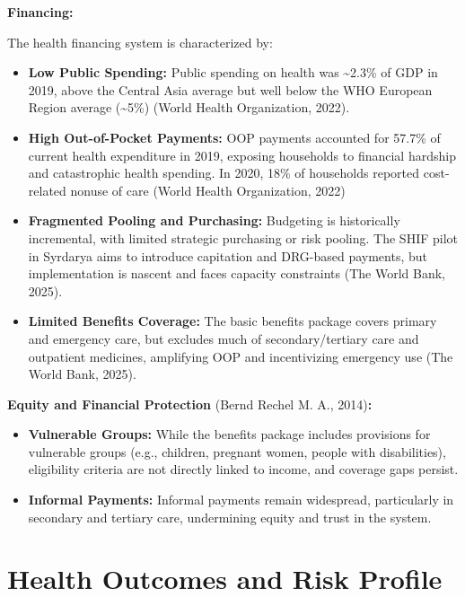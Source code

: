 \textbf{Financing:}

The health financing system is characterized by:

\begin{itemize}
\item
  \textbf{Low Public Spending:} Public spending on health was
  \textasciitilde2.3\% of GDP in 2019, above the Central Asia average
  but well below the WHO European Region average (\textasciitilde5\%)
  (World Health Organization, 2022).
\item
  \textbf{High Out-of-Pocket Payments:} OOP payments accounted for
  57.7\% of current health expenditure in 2019, exposing households to
  financial hardship and catastrophic health spending. In 2020, 18\% of
  households reported cost-related nonuse of care (World Health
  Organization, 2022)
\item
  \textbf{Fragmented Pooling and Purchasing:} Budgeting is historically
  incremental, with limited strategic purchasing or risk pooling. The
  SHIF pilot in Syrdarya aims to introduce capitation and DRG-based
  payments, but implementation is nascent and faces capacity constraints
  (The World Bank, 2025).
\item
  \textbf{Limited Benefits Coverage:} The basic benefits package covers
  primary and emergency care, but excludes much of secondary/tertiary
  care and outpatient medicines, amplifying OOP and incentivizing
  emergency use (The World Bank, 2025).
\end{itemize}

\textbf{Equity and Financial Protection} (Bernd Rechel M. A.,
2014)\textbf{:}

\begin{itemize}
\item
  \textbf{Vulnerable Groups:} While the benefits package includes
  provisions for vulnerable groups (e.g., children, pregnant women,
  people with disabilities), eligibility criteria are not directly
  linked to income, and coverage gaps persist.
\item
  \textbf{Informal Payments:} Informal payments remain widespread,
  particularly in secondary and tertiary care, undermining equity and
  trust in the system.
\end{itemize}

\section{Health Outcomes and Risk Profile}\label{health-outcomes-and-risk-profile}

